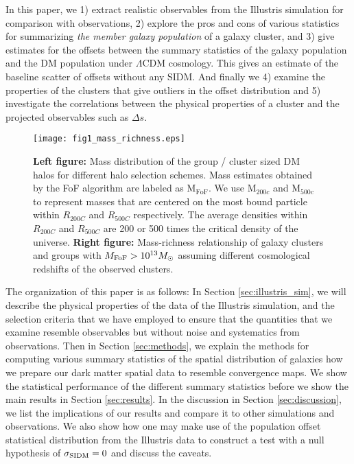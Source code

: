 In this paper, we 
1) extract realistic observables from the Illustris simulation for
comparison with observations, 2) explore the pros and cons of various statistics for 
summarizing {\it the member galaxy population} of a galaxy cluster, and 3)	
give estimates for the offsets between the summary statistics of the galaxy  
population and the DM population under $\Lambda$CDM cosmology.
This gives
an estimate of the baseline scatter of offsets without any SIDM. And finally we 
4) examine the properties of the clusters that give outliers in 
the offset distribution and 5) investigate the  
correlations between the physical properties of a cluster and the projected 
observables such as $\Delta s$. 
\begin{figure*}
	\texttt{[image: fig1\_mass\_richness.eps]}
	\caption{ {\bf Left figure:} Mass distribution of the group / cluster sized 
		DM halos for different halo selection schemes. Mass estimates obtained by the
		FoF algorithm are labeled as  M$_{\text{FoF}}$.
		We use M$_{200c}$ and M$_{500c}$ to represent 
		masses that are centered on the most bound particle within $R_{200C}$ and
		$R_{500C}$ respectively. The  
		average densities within $R_{200C}$ and $R_{500C}$ are 
		200 or 500 times the critical density of the universe. 
		{\bf Right figure:} 
		Mass-richness relationship of galaxy clusters and groups with 
		$M_{\rm FoF} > 10^{13} M_{\odot}$ assuming different cosmological redshifts
		of the observed clusters. 
\label{fig:mass_richness}}
\end{figure*}

The organization of this paper is as follows:
In Section \ref{sec:illustris_sim}, we will describe the physical properties of 
the data of the Illustris
simulation, 
and the selection criteria that we have employed to ensure that the
quantities that we examine resemble observables but without noise and
systematics from observations. 
Then in Section \ref{sec:methods}, 
we explain the methods for computing various 
summary statistics of the spatial distribution of galaxies how we prepare our dark
matter spatial data to resemble convergence maps. We show the statistical performance
of the different summary statistics before we show the main results
in Section \ref{sec:results}. In the discussion in Section \ref{sec:discussion}, 
we list the implications of our
results and compare it to other simulations and observations. We also 
show how one may make use of the population offset statistical distribution
from the Illustris data to construct a test with 
a null hypothesis of $\sigma_{\rm SIDM} = 0$ and discuss the caveats. 

